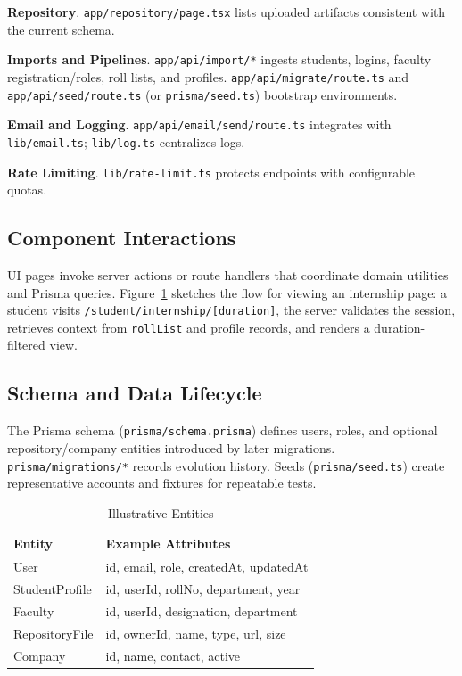 \documentclass[conference]{IEEEtran}
\begin{document}
\textbf{Repository}. \texttt{app/repository/page.tsx} lists uploaded artifacts consistent with the current schema.

\textbf{Imports and Pipelines}. \texttt{app/api/import/*} ingests students, logins, faculty registration/roles, roll lists, and profiles. \texttt{app/api/migrate/route.ts} and \texttt{app/api/seed/route.ts} (or \texttt{prisma/seed.ts}) bootstrap environments.

\textbf{Email and Logging}. \texttt{app/api/email/send/route.ts} integrates with \texttt{lib/email.ts}; \texttt{lib/log.ts} centralizes logs.

\textbf{Rate Limiting}. \texttt{lib/rate-limit.ts} protects endpoints with configurable quotas.

\subsection{Component Interactions}
UI pages invoke server actions or route handlers that coordinate domain utilities and Prisma queries. Figure~\ref{fig:seq} sketches the flow for viewing an internship page: a student visits \texttt{/student/internship/[duration]}, the server validates the session, retrieves context from \texttt{rollList} and profile records, and renders a duration-filtered view.

\begin{figure}[t]
  \centering
  \label{fig:seq}
\end{figure}

\subsection{Schema and Data Lifecycle}
The Prisma schema (\texttt{prisma/schema.prisma}) defines users, roles, and optional repository/company entities introduced by later migrations. \texttt{prisma/migrations/*} records evolution history. Seeds (\texttt{prisma/seed.ts}) create representative accounts and fixtures for repeatable tests.

\begin{table}[t]
\centering
\caption{Illustrative Entities}
\label{tab:entities}
\begin{tabular}{p{2.9cm}p{5.0cm}}
\toprule
\textbf{Entity} & \textbf{Example Attributes} \\
\midrule
User & id, email, role, createdAt, updatedAt \\
StudentProfile & id, userId, rollNo, department, year \\
Faculty & id, userId, designation, department \\
RepositoryFile & id, ownerId, name, type, url, size \\
Company & id, name, contact, active \\
\bottomrule
\end{tabular}
\end{table}
\end{document}
